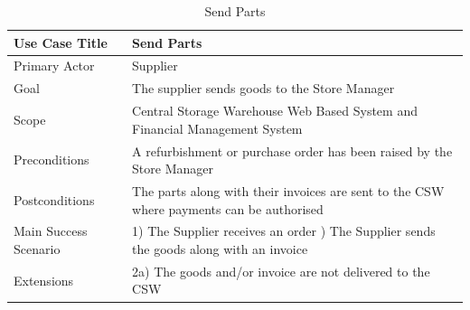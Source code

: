 \begin{table}[]
	\centering
	\caption{Send Parts}
	\label{Send-Parts}
	\begin{tabularx}{\textwidth}{| l | X |}
		\hline
		Use Case Title	&  Send Parts\\ \hline \hline
		Primary Actor	&  Supplier\\ \hline
		Goal	&  The supplier sends goods to the Store Manager\\ \hline
		Scope	&  Central Storage Warehouse Web Based System and Financial Management System\\ \hline
		Preconditions	&  A refurbishment or purchase order has been raised by the Store Manager\\ \hline
		Postconditions	&  The parts along with their invoices are sent to the CSW where payments can be authorised\\ \hline
		Main Success Scenario	& 
			1) The Supplier receives an order \newline
			2) The Supplier sends the goods along with an invoice
		\\ \hline
		Extensions	&  2a) The goods and/or invoice are not delivered to the CSW \\ \hline
	\end{tabularx}
\end{table}